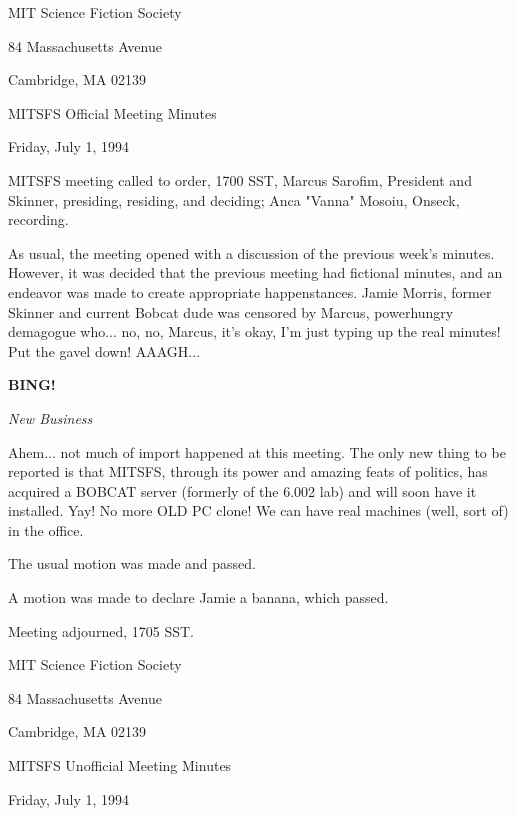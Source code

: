 \documentclass[12pt]{article}
\newcommand{\bing}{{\bf BING!} }
\newcommand{\goto}[1]{\bing \vskip 12pt \centerline{{\em{#1}}}}
\begin{document}
\begin{center}

MIT Science Fiction Society 

84 Massachusetts Avenue

Cambridge, MA 02139

\vspace{12pt}

MITSFS Official Meeting Minutes 

Friday, July 1, 1994

\end{center}
 
\vspace{18pt}

\setlength{\parskip}{6pt}

\noindent
MITSFS meeting called to order, 1700 SST,
Marcus Sarofim, President and Skinner, presiding, residing, and deciding; Anca "Vanna" Mosoiu, Onseck, recording.

As usual, the meeting opened with a discussion of the previous week's minutes. However, it was decided that the previous meeting had fictional minutes, and an endeavor was made to create appropriate happenstances. Jamie Morris, former Skinner and current Bobcat dude was censored by Marcus, powerhungry demagogue who... no, no, Marcus, it's okay, I'm just typing up the real minutes! Put the gavel down! AAAGH...

\goto{New Business}

Ahem... not much of import happened at this meeting. The only new thing to be reported is that MITSFS, through its power and amazing feats of politics, has acquired a BOBCAT server (formerly of the 6.002 lab) and will soon have it installed. Yay! No more OLD PC clone! We can have real machines (well, sort of) in the office.

The usual motion was made and passed.

A motion was made to declare Jamie a banana, which passed.

\vspace{12pt}

\noindent
Meeting adjourned, 1705 SST.

\begin{center}

MIT Science Fiction Society 

84 Massachusetts Avenue

Cambridge, MA 02139

\vspace{12pt}

MITSFS Unofficial Meeting Minutes 

Friday, July 1, 1994

\end{center}
 
\end{document}
